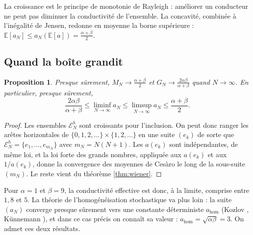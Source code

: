 \documentclass[11pt,a4paper]{article}
\theoremstyle{plain}
\newtheorem{proposition}[theoreme]{Proposition}
\theoremstyle{definition}
\theoremstyle{remark}
\newcommand{\E}{\mathcal{E}}
\begin{document}
La croissance est le principe de monotonie de Rayleigh : améliorer un conducteur ne peut pas diminuer la conductivité de l'ensemble. La concavité, combinée à l'inégalité de Jensen, redonne en moyenne la borne supérieure : $\mathbb{E}[a_N]\leq a_N(\mathbb{E}[a])=\frac{\alpha+\beta}2$.

\subsection{Quand la boîte grandit}

\begin{proposition}\label{prop:lgn}
Presque sûrement, $M_N\to\frac{\alpha+\beta}2$ et $G_N\to\frac{2\alpha\beta}{\alpha+\beta}$ quand $N\to\infty$. En particulier, presque sûrement,
\[
  \frac{2\alpha\beta}{\alpha+\beta}\leq\liminf_{N\to\infty}a_N\leq\limsup_{N\to\infty}a_N\leq\frac{\alpha+\beta}2 .
\]
\end{proposition}

\begin{proof}
Les ensembles $\E^h_N$ sont croissants pour l'inclusion. On peut donc ranger les arêtes horizontales de $\{0,1,2,\dots\}\times\{1,2,\dots\}$ en une suite $(e_k)$ de sorte que $\E^h_N=\{e_1,\dots,e_{m_N}\}$ avec $m_N=N(N+1)$. Les $a(e_k)$ sont indépendantes, de même loi, et la loi forte des grands nombres, appliquée aux $a(e_k)$ et aux $1/a(e_k)$, donne la convergence des moyennes de Cesàro le long de la sous-suite $(m_N)$. Le reste vient du théorème \ref{thm:wiener}.
\end{proof}

Pour $\alpha=1$ et $\beta=9$, la conductivité effective est donc, à la limite, comprise entre $1{,}8$ et $5$. La théorie de l'homogénéisation stochastique va plus loin : la suite $(a_N)$ converge presque sûrement vers une constante déterministe $a_{\mathrm{hom}}$ (Kozlov \cite{kozlov}, Künnemann \cite{kunnemann}), et dans ce cas précis on connaît sa valeur : $a_{\mathrm{hom}}=\sqrt{\alpha\beta}=3$. On admet ces deux résultats.
\end{document}
